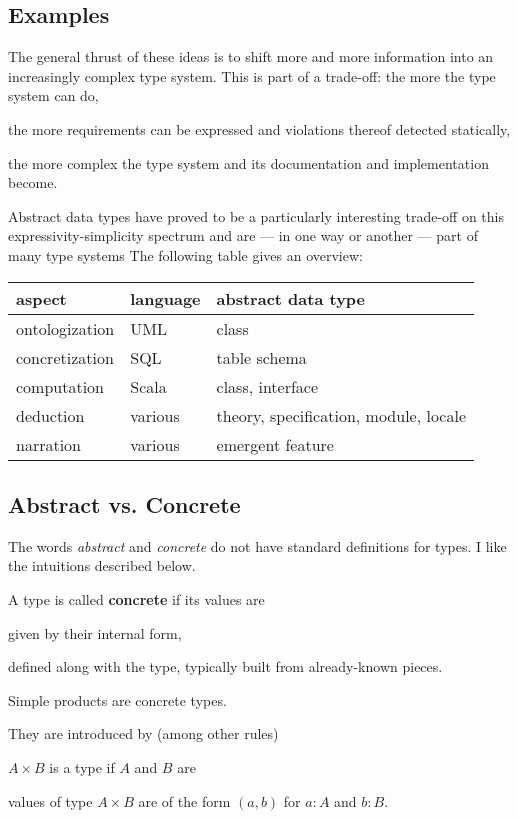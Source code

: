 \subsection{Examples}

The general thrust of these ideas is to shift more and more information into an increasingly complex type system.
This is part of a trade-off: the more the type system can do,
\begin{compactitem}
 \item the more requirements can be expressed and violations thereof detected statically,
 \item the more complex the type system and its documentation and implementation become.
\end{compactitem}

Abstract data types have proved to be a particularly interesting trade-off on this expressivity-simplicity spectrum and are --- in one way or another --- part of many type systems
The following table gives an overview:
\begin{center}
\begin{tabular}{l|ll}
aspect & language & abstract data type \\
\hline
ontologization & UML & class \\
concretization & SQL & table schema \\
computation & Scala & class, interface \\
deduction & various & theory, specification, module, locale \\
narration & various & emergent feature
\end{tabular}
\end{center}

\subsection{Abstract vs. Concrete}

The words \emph{abstract} and \emph{concrete} do not have standard definitions for types.
I like the intuitions described below.

A type is called \textbf{concrete} if its values are
\begin{compactitem}
\item given by their internal form,
\item defined along with the type, typically built from already-known pieces.
\end{compactitem}

\begin{example}
Simple products are concrete types.

They are introduced by (among other rules)
\begin{compactitem}
 \item $A\times B$ is a type if $A$ and $B$ are
 \item values of type $A\times B$ are of the form $(a,b)$ for $a:A$ and $b:B$.
\end{compactitem}
\end{example}


